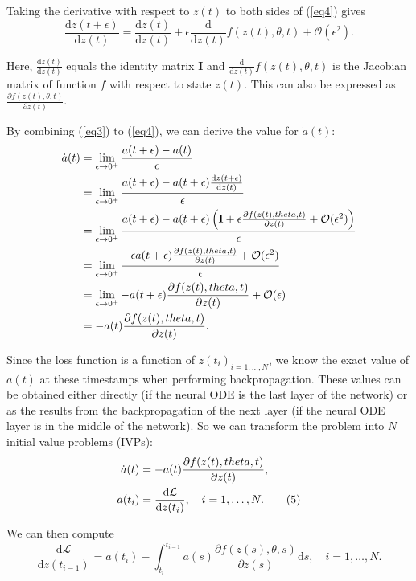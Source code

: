 \documentclass[a4paper,11pt,titlepage]{article}
\theoremstyle{definition}
\theoremstyle{plain}
\theoremstyle{remark}
\begin{document}
Taking the derivative with respect to $z(t)$ to both sides of (\ref{eq4}) gives
$$
\frac{\mathrm{d}z(t+\epsilon)}{\mathrm{d}z(t)} = \frac{\mathrm{d}z(t)}{\mathrm{d}z(t)}+\epsilon\frac{\mathrm{d}}{\mathrm{d}z(t)}f(z(t),\theta,t)+\mathcal{O}(\epsilon^2).
$$

Here, $\frac{\mathrm{d}z(t)}{\mathrm{d}z(t)}$ equals the identity matrix $\mathbf{I}$ and $\frac{\mathrm{d}}{\mathrm{d}z(t)}f(z(t),\theta,t)$ is the Jacobian matrix of function $f$ with respect to state $z(t)$. This can also be expressed as $\frac{\partial f(z(t),\theta,t)}{\partial z(t)}$.

By combining (\ref{eq3}) to (\ref{eq4}), we can derive the value for $\dot{a}(t)$:
\begin{align}
\dot{a}(t) &= \lim_{\epsilon \to 0^{+}}\frac{a(t+\epsilon)-a(t)}{\epsilon}\notag\\
&=\lim_{\epsilon \to 0^{+}}\frac{a(t+\epsilon)-a(t+\epsilon)\frac{\mathrm{d} z(t+\epsilon)}{\mathrm{d}z(t)}}{\epsilon}\notag\\
&=\lim_{\epsilon \to 0^{+}}\frac{a(t+\epsilon)-a(t+\epsilon)\left(\mathbf{I}+\epsilon\frac{\partial f(z(t),\theta,t)}{\partial z(t)}+\mathcal{O}(\epsilon^2)\right)}{\epsilon}\notag\\
&=\lim_{\epsilon \to 0^{+}}\frac{-\epsilon a(t+\epsilon)\frac{\partial f(z(t),\theta,t)}{\partial z(t)}+\mathcal{O}(\epsilon^2)}{\epsilon}\notag
\\
&=\lim_{\epsilon \to 0^{+}}-a(t+\epsilon)\frac{\partial f(z(t),\theta,t)}{\partial z(t)}+\mathcal{O}(\epsilon)\notag\\
&=-a(t)\frac{\partial f(z(t),\theta,t)}{\partial z(t)}.\notag
\end{align}

Since the loss function is a function of $z(t_i)_{i=1,\dots,N}$, we know the exact value of $a(t)$ at these timestamps when performing backpropagation. These values can be obtained either directly (if the neural ODE is the last layer of the network) or as the results from the backpropagation of the next layer (if the neural ODE layer is in the middle of the network). So we can transform the problem into $N$ initial value problems (IVPs):
\begin{align}{\label{eq5}}
    \dot{a}(t) &= -a(t)\frac{\partial f(z(t),\theta,t)}{\partial z(t)},\notag\\
    a(t_i) &= \frac{\mathrm{d}\mathcal{L}}{\mathrm{d} z(t_i)},\quad i=1,\dots,N. \tag{5}
\end{align}

We can then compute
$$
\frac{\mathrm{d}\mathcal{L}}{\mathrm{d}z(t_{i-1})} =a(t_i)- \int_{t_i}^{t_{i-1}}a(s)\frac{\partial f(z(s),\theta,s)}{\partial z(s)}\mathrm{d}s,\quad i=1,\dots,N.
$$
\end{document}
